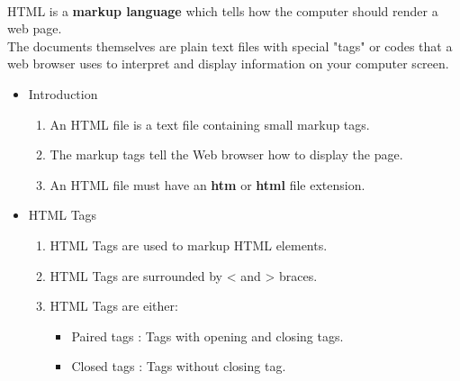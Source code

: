 \paragraph{} HTML is a \textbf{markup language} which tells how the computer should render a web page.\\ The documents themselves are plain text files with special "tags" or codes that a web browser uses to interpret and display
information on your computer screen. \\
\begin{itemize}
	\item Introduction
\begin{enumerate}
	\item An HTML file is a text file containing small markup tags.
	\item The markup tags tell the Web browser how to display the page.
	\item An HTML file must have an \textbf{htm} or \textbf{html} file extension. 
\end{enumerate}
    \item HTML Tags 
    \begin{enumerate}
    	\item HTML Tags are used to markup HTML elements.
    	\item HTML Tags are surrounded by < and > braces.
    	\item HTML Tags are either:
    	\begin{itemize}
    		\item Paired tags : Tags with opening and closing tags.
    		\item Closed tags : Tags without closing tag.
    	\end{itemize}
    \end{enumerate}
\newpage


\end{itemize}
